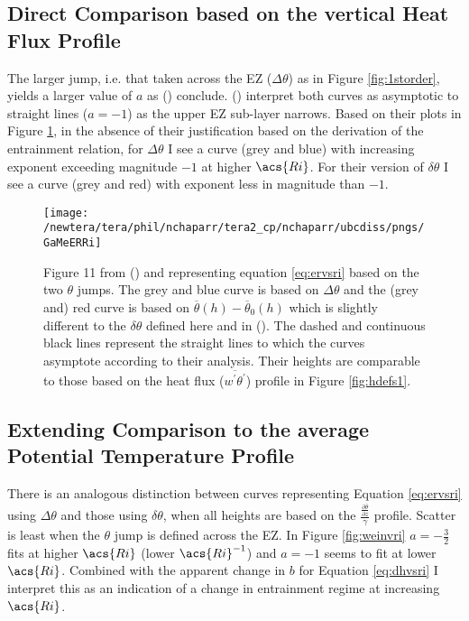 \subsection{Direct Comparison based on the vertical Heat Flux Profile}
The larger jump, i.e. that taken across the \acs{EZ} ($\Delta \theta$) as in Figure \ref{fig:1storder}, yields a larger value of $a$ as \citeauthor{FedConzMir04} (\citeyear{FedConzMir04}) conclude.  \citeauthor{GarciaMellado} (\citeyear{GarciaMellado}) interpret both curves as asymptotic to straight lines ($a=-1$) as the upper \acs{EZ} sub-layer narrows. Based on their plots in Figure \ref{fig:GarcMelERRi}, in the absence of their justification based on the derivation of the entrainment relation, for $\Delta \theta$ I see a curve (grey and blue) with increasing exponent exceeding magnitude $-1$ at higher $\acs{Ri}$.  For their version of $\delta \theta$ I see a curve (grey and red) with exponent less in magnitude than $-1$.\\

\begin{figure}[htbp]
    \centering
    \texttt{[image: /newtera/tera/phil/nchaparr/tera2\_cp/nchaparr/ubcdiss/pngs/GaMeERRi]}
    \caption[Plots of scaled entrainment rate vs Richardson number from \citeauthor{GarciaMellado} (\citeyear{GarciaMellado})]{Figure 11 from \citeauthor{GarciaMellado} (\citeyear{GarciaMellado}) and representing equation \ref{eq:ervsri} based on the two $\theta$ jumps.  The grey and blue curve is based on $\Delta \theta$ and the (grey and) red curve is based on $\overline{\theta}(h) - \overline{\theta}_{0}(h)$ which is slightly different to the $\delta \theta$ defined here and in \citeauthor{FedConzMir04} (\citeyear{FedConzMir04}). The dashed and continuous black lines represent the straight lines to which the curves asymptote according to their analysis. Their heights are comparable to those based on the heat flux ($\overline{w^{'}\theta^{'}}$) profile in Figure \ref{fig:hdefs1}.}
    \label{fig:GarcMelERRi}   %
\end{figure}

\subsection{Extending Comparison to the average Potential Temperature Profile}

There is an analogous distinction between curves representing Equation \ref{eq:ervsri} using $\Delta \theta$ and those using $\delta \theta$, when all heights are based on the $\frac{\frac{\partial \overline{\theta}}{\partial z}}{\gamma}$ profile.  Scatter is least when the $\theta$ jump is defined across the \acs{EZ}.  In Figure \ref{fig:weinvri} $a=-\frac{3}{2}$ fits at higher $\acs{Ri}$ (lower $\acs{Ri}^{-1}$) and $a=-1$ seems to fit at lower $\acs{Ri}$.  Combined with the apparent change in $b$ for Equation \ref{eq:dhvsri} I interpret this as an indication of a change in entrainment regime at increasing $\acs{Ri}$.\\ 

\FloatBarrier


\endinput

Any text after an \endinput is ignored.
You could put scraps here or things in progress.
